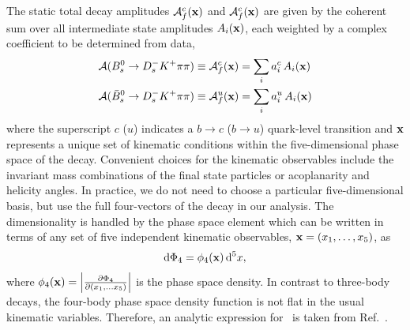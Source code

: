 The static total decay amplitudes  $\mathcal A^c_{f}(\mathbf{x})$  and $ \mathcal A^c_{f}(\mathbf{x})$ 
are given by the coherent sum over all intermediate state amplitudes $A_i(\mathbf{x})$, each weighted by a complex coefficient
to be determined from data,
 \begin{align}
 \mathcal A(B_s^0 \rightarrow D_s^{-} K^{+} \pi\pi) &\equiv \mathcal{A}^c_f(\mathbf{x}) = \sum_i a^c_i \, A_i(\mathbf{x})   \\
 \mathcal A(\bar B_s^0 \rightarrow D_s^{-} K^{+} \pi\pi) &\equiv \mathcal A^u_f(\mathbf{x})  =  \sum_i  a^u_i \, A_i(\mathbf{x})   
 \end{align}
where the superscript $c$ ($u$) indicates a $b \to c$ ($b\to u$) quark-level transition  
and $\mathbf{x}$ 
represents a unique set of kinematic conditions within the five-dimensional phase space of the decay.
Convenient choices for the kinematic observables
include the invariant mass combinations of the final state particles%
or acoplanarity and helicity angles. %
In practice, we do not need to choose a particular five-dimensional
basis, but use the full four-vectors of the decay in our
analysis. 
The dimensionality is handled by the phase space element which can be written in terms of any set of five independent kinematic observables, $\mathbf{x} = (x_1, \ldots, x_5)$, as
\begin{equation}
	\mathrm{d}\Phi_4 = \phi_4(\mathbf{x}) \, \mathrm{d}^5x ,
\end{equation}
where $\phi_{4}(\mathbf{x} ) = \left\vert  \frac{\partial \Phi_4}{\partial(x_1, \ldots x_5)} \right\vert$ is the phase space density.
In contrast to three-body decays, the four-body phase space density
function is not flat in the usual kinematic variables.  
Therefore, an analytic expression for \phsd\ is
taken from Ref.~\cite{kinematics}.

